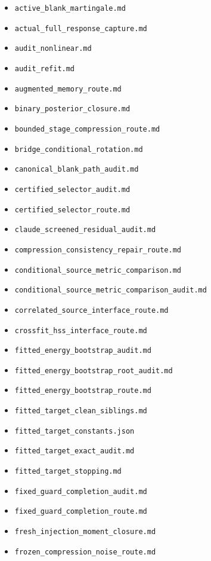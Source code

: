 \documentclass[11pt,oneside,openany,a4paper]{book}
\numberwithin{equation}{chapter}
\theoremstyle{definition}
\theoremstyle{remark}
\newcommand{\sourcefile}[1]{{\small\nolinkurl{#1}}}
\begin{document}
\begingroup\small
\begin{itemize}[leftmargin=1.2em,itemsep=1pt,topsep=3pt]
\item \sourcefile{active_blank_martingale.md}
\item \sourcefile{actual_full_response_capture.md}
\item \sourcefile{audit_nonlinear.md}
\item \sourcefile{audit_refit.md}
\item \sourcefile{augmented_memory_route.md}
\item \sourcefile{binary_posterior_closure.md}
\item \sourcefile{bounded_stage_compression_route.md}
\item \sourcefile{bridge_conditional_rotation.md}
\item \sourcefile{canonical_blank_path_audit.md}
\item \sourcefile{certified_selector_audit.md}
\item \sourcefile{certified_selector_route.md}
\item \sourcefile{claude_screened_residual_audit.md}
\item \sourcefile{compression_consistency_repair_route.md}
\item \sourcefile{conditional_source_metric_comparison.md}
\item \sourcefile{conditional_source_metric_comparison_audit.md}
\item \sourcefile{correlated_source_interface_route.md}
\item \sourcefile{crossfit_hss_interface_route.md}
\item \sourcefile{fitted_energy_bootstrap_audit.md}
\item \sourcefile{fitted_energy_bootstrap_root_audit.md}
\item \sourcefile{fitted_energy_bootstrap_route.md}
\item \sourcefile{fitted_target_clean_siblings.md}
\item \sourcefile{fitted_target_constants.json}
\item \sourcefile{fitted_target_exact_audit.md}
\item \sourcefile{fitted_target_stopping.md}
\item \sourcefile{fixed_guard_completion_audit.md}
\item \sourcefile{fixed_guard_completion_route.md}
\item \sourcefile{fresh_injection_moment_closure.md}
\item \sourcefile{frozen_compression_noise_route.md}

\end{itemize}
\end{document}
